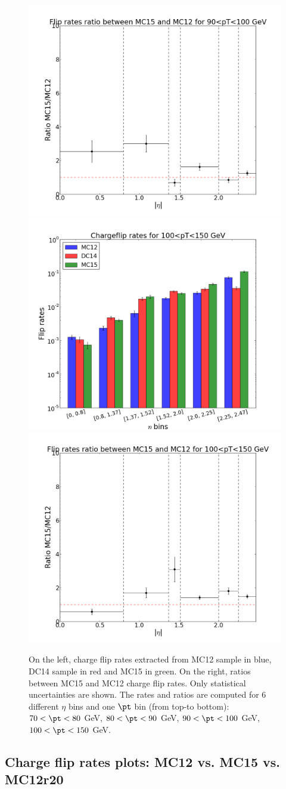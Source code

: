 \begin{figure}[!htbp]
\includegraphics[width=0.33\linewidth]{FIGURES/BKG/chargeFlip/APPENDIX/ratio_MC15vsMC12/ratio_plot_90.png}
\vfill
\includegraphics[width=0.33\linewidth]{FIGURES/BKG/chargeFlip/APPENDIX/fliprates_MC12/fliprates_3samples_100.png}
\includegraphics[width=0.33\linewidth]{FIGURES/BKG/chargeFlip/APPENDIX/ratio_MC15vsMC12/ratio_plot_100.png}
\caption{\label{fig:12vs15_7080} On the left, charge flip rates extracted from MC12 sample in blue, DC14 sample in red and MC15 in green. On the right, ratios between MC15 and MC12 charge flip rates. Only statistical uncertainties are shown. The rates and ratios are computed for 6 different $\eta$ bins and one $\pt$ bin (from top-to bottom): $70<\pt<80$ GeV, $80<\pt<90$ GeV, $90<\pt<100$ GeV, $100<\pt<150$ GeV.}
\end{figure}

\FloatBarrier

\subsection{Charge flip rates plots: MC12 vs. MC15 vs. MC12r20}
\label{app:CFrates2}

